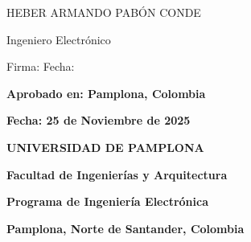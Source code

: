 \vspace{0.2cm}

\noindent
HEBER ARMANDO PABÓN CONDE

\noindent
Ingeniero Electrónico

\vspace{0.3cm}

\noindent
Firma: \underline{\hspace{7cm}} \quad Fecha: \underline{\hspace{2cm}}

\vspace{2cm}

\begin{center}
\vspace{1cm}

\textbf{Aprobado en: Pamplona, Colombia}

\vspace{0.3cm}

\textbf{Fecha: 25 de Noviembre de 2025}

\vspace{1.5cm}

\textbf{UNIVERSIDAD DE PAMPLONA}

\textbf{Facultad de Ingenierías y Arquitectura}

\textbf{Programa de Ingeniería Electrónica}

\textbf{Pamplona, Norte de Santander, Colombia}

\end{center}








